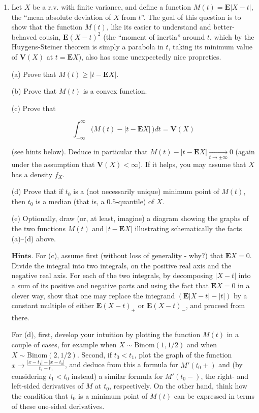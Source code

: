 \begin{enumerate}[label=\arabic*.]
\noindent (c) Deduce the following converse to the Strong Law
of Large Numbers in the case of undefined
expectations: If $X_1,X_2,\ldots$ are i.i.d. and
$\mathbf{E} X_1$ is undefined (meaning that
$\mathbf{E} {X_1}_+ = \mathbf{E} {X_1}_- = \infty$)
then

\[
\mathrm{P}\left( \lim_{n\to\infty} \frac{1}{n}\sum_{k=1}^n X_k\textrm{ does not exist} \right) = 1.
\]

\item Let $X$ be a r.v. with finite variance, and define a
function $M(t)=\mathbf{E}|X-t|$, the ``mean absolute
deviation of $X$ from $t$''. The goal of this
question is to show that the function $M(t)$, like
its easier to understand and better-behaved cousin,
$\mathbf{E}(X-t)^2$ (the ``moment of inertia'' around
$t$, which by the Huygens-Steiner theorem is simply a
parabola in $t$, taking its minimum value of
$\mathbf{V}(X)$ at $t=\mathbf{E} X$), also has some
unexpectedly nice propreties.

(a) Prove that $M(t) \ge |t- \mathbf{E} X|$.

(b) Prove that $M(t)$ is a convex function.

(c) Prove that

\[
\int_{-\infty}^\infty \Big( M(t)-|t-\mathbf{E} X|\, \Big)  dt =  \mathbf{V}(X)
\]

\noindent (see hints below). Deduce in particular that
$M(t)-|t-\mathbf{E} X|\xrightarrow[t\to\pm \infty]{}
0$
(again under the assumption that
$\mathbf{V}(X)<\infty$). If it helps, you may assume
that $X$ has a density $f_X$.

(d) Prove that if $t_0$ is a (not necessarily unique)
minimum point of $M(t)$, then $t_0$ is a median (that
is, a $0.5$-quantile) of $X$.

(e) Optionally, draw (or, at least, imagine) a
diagram showing the graphs of the two functions $M(t)$
and $|t-\mathbf{E} X|$ illustrating schematically the
facts (a)--(d) above.

$\textbf{Hints.}$ For (c), assume first (without loss
of generality - why?) that $\mathbf{E} X=0$. Divide
the integral into two integrals, on the positive real
axis and the negative real axis. For each of the two
integrals, by decomposing $|X-t|$ into a sum of its
positive and negative parts and using the fact that
$\mathbf{E} X=0$ in a clever way, show that one may
replace the integrand $(\mathbf{E}|X-t|-|t|)$ by a
constant multiple of either $\mathbf{E}(X-t)_+$ or
$\mathbf{E}(X-t)_-$, and proceed from there.

For (d), first, develop your intuition by plotting
the function $M(t)$ in a couple of cases, for example
when $X\sim \textrm{Binom}(1,1/2)$ and when
$X\sim \textrm{Binom}(2,1/2)$. Second, if $t_0<t_1$,
plot the graph of the function
$x\to \frac{|x-t_1|-|x-t_0|}{t_1-t_0}$, and deduce
from this a formula for $M'(t_0+)$ and (by
considering $t_1<t_0$ instead) a similar formula for
$M'(t_0-)$, the right- and left-sided derivatives of
$M$ at $t_0$, respectively. On the other hand, think
how the condition that $t_0$ is a minimum point of
$M(t)$ can be expressed in terms of these one-sided
derivatives.


\end{enumerate}

